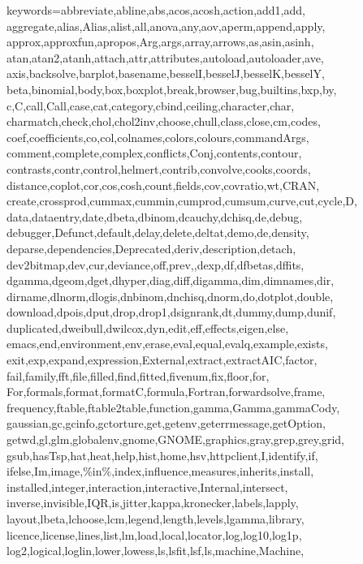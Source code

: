 \usepackage{listings}
{}%
  {keywords={abbreviate,abline,abs,acos,acosh,action,add1,add,%
      aggregate,alias,Alias,alist,all,anova,any,aov,aperm,append,apply,%
      approx,approxfun,apropos,Arg,args,array,arrows,as,asin,asinh,%
      atan,atan2,atanh,attach,attr,attributes,autoload,autoloader,ave,%
      axis,backsolve,barplot,basename,besselI,besselJ,besselK,besselY,%
      beta,binomial,body,box,boxplot,break,browser,bug,builtins,bxp,by,%
      c,C,call,Call,case,cat,category,cbind,ceiling,character,char,%
      charmatch,check,chol,chol2inv,choose,chull,class,close,cm,codes,%
      coef,coefficients,co,col,colnames,colors,colours,commandArgs,%
      comment,complete,complex,conflicts,Conj,contents,contour,%
      contrasts,contr,control,helmert,contrib,convolve,cooks,coords,%
      distance,coplot,cor,cos,cosh,count,fields,cov,covratio,wt,CRAN,%
      create,crossprod,cummax,cummin,cumprod,cumsum,curve,cut,cycle,D,%
      data,dataentry,date,dbeta,dbinom,dcauchy,dchisq,de,debug,%
      debugger,Defunct,default,delay,delete,deltat,demo,de,density,%
      deparse,dependencies,Deprecated,deriv,description,detach,%
      dev2bitmap,dev,cur,deviance,off,prev,,dexp,df,dfbetas,dffits,%
      dgamma,dgeom,dget,dhyper,diag,diff,digamma,dim,dimnames,dir,%
      dirname,dlnorm,dlogis,dnbinom,dnchisq,dnorm,do,dotplot,double,%
      download,dpois,dput,drop,drop1,dsignrank,dt,dummy,dump,dunif,%
      duplicated,dweibull,dwilcox,dyn,edit,eff,effects,eigen,else,%
      emacs,end,environment,env,erase,eval,equal,evalq,example,exists,%
      exit,exp,expand,expression,External,extract,extractAIC,factor,%
      fail,family,fft,file,filled,find,fitted,fivenum,fix,floor,for,%
      For,formals,format,formatC,formula,Fortran,forwardsolve,frame,%
      frequency,ftable,ftable2table,function,gamma,Gamma,gammaCody,%
      gaussian,gc,gcinfo,gctorture,get,getenv,geterrmessage,getOption,%
      getwd,gl,glm,globalenv,gnome,GNOME,graphics,gray,grep,grey,grid,%
      gsub,hasTsp,hat,heat,help,hist,home,hsv,httpclient,I,identify,if,%
      ifelse,Im,image,\%in\%,index,influence,measures,inherits,install,%
      installed,integer,interaction,interactive,Internal,intersect,%
      inverse,invisible,IQR,is,jitter,kappa,kronecker,labels,lapply,%
      layout,lbeta,lchoose,lcm,legend,length,levels,lgamma,library,%
      licence,license,lines,list,lm,load,local,locator,log,log10,log1p,%
      log2,logical,loglin,lower,lowess,ls,lsfit,lsf,ls,machine,Machine,%
}}
